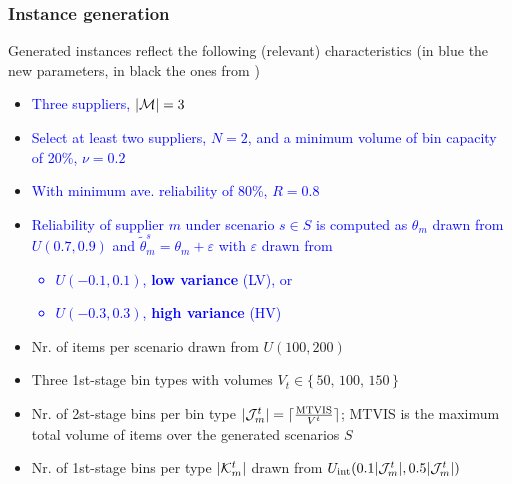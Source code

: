 \documentclass[,9pt,xcolor={dvipsnames}]{beamer} %
\begin{document}
\begin{frame}%
	\frametitle{Instance generation}
	Generated instances reflect the following (relevant) characteristics (in blue the new parameters, in black the ones from \cite{crainic2024})
	\begin{itemize}
		\small
		\medskip
		\item<1-> \textcolor{blue}{Three suppliers, $|{\cal M}| = 3$}
		\medskip
		\item<2-> \textcolor{blue}{Select at least two suppliers, $N = 2$, and a minimum volume of bin capacity of 20\%, $\nu = 0.2$}
		\medskip
		\item<3-> \textcolor{blue}{With minimum ave. reliability of 80\%, $R = 0.8$}
		\medskip
		\item<4-> \textcolor{blue}{Reliability of supplier $ m$ under scenario $ s \in S$ is computed as $\theta_{m}$ drawn from $U(0.7, 0.9)$ and $ \tilde{\theta}^s_m = \theta_m + \varepsilon$ with $  \varepsilon $ drawn from
		\begin{itemize}
			\small
			\item<4->  \textcolor{blue}{$ U(-0.1, 0.1)$, \textbf{low variance} (LV), or}
			\item<5->  \textcolor{blue}{$ U(-0.3, 0.3)$, \textbf{high variance} (HV)}
		\end{itemize}}
		\medskip
		\item<6-> Nr. of items per scenario drawn from $U(100, 200)$
		\medskip
		\item<7-> Three 1st-stage bin types with volumes $ V_t \in \{ \, 50, \, 100, \, 150 \, \}$
		\medskip
		\item<8-> Nr. of 2st-stage bins per bin type $ | {\cal J}^t_m | = \lceil \frac{\text{MTVIS}}{V^t} \rceil $; MTVIS is the maximum total volume of items over the generated scenarios $ S$
		\medskip
		\item<9-> Nr. of 1st-stage bins per type $ | {\cal K}^t_m |$ drawn from $ U_{\text{int}}( 0.1 | {\cal J}^t_m |, 0.5 | {\cal J}^t_m |)$
	\end{itemize}
\end{frame}
\end{document}
